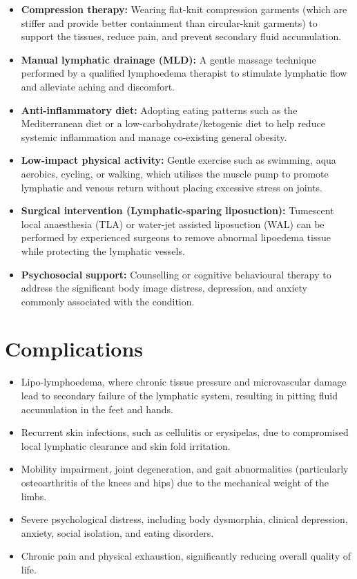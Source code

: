 \begin{itemize}
    \item \textbf{Compression therapy:} Wearing flat-knit compression garments (which are stiffer and provide better containment than circular-knit garments) to support the tissues, reduce pain, and prevent secondary fluid accumulation.
    \item \textbf{Manual lymphatic drainage (MLD):} A gentle massage technique performed by a qualified lymphoedema therapist to stimulate lymphatic flow and alleviate aching and discomfort.
    \item \textbf{Anti-inflammatory diet:} Adopting eating patterns such as the Mediterranean diet or a low-carbohydrate/ketogenic diet to help reduce systemic inflammation and manage co-existing general obesity.
    \item \textbf{Low-impact physical activity:} Gentle exercise such as swimming, aqua aerobics, cycling, or walking, which utilises the muscle pump to promote lymphatic and venous return without placing excessive stress on joints.
    \item \textbf{Surgical intervention (Lymphatic-sparing liposuction):} Tumescent local anaesthesia (TLA) or water-jet assisted liposuction (WAL) can be performed by experienced surgeons to remove abnormal lipoedema tissue while protecting the lymphatic vessels.
    \item \textbf{Psychosocial support:} Counselling or cognitive behavioural therapy to address the significant body image distress, depression, and anxiety commonly associated with the condition.
\end{itemize}

\section*{Complications}
\begin{itemize}
    \item Lipo-lymphoedema, where chronic tissue pressure and microvascular damage lead to secondary failure of the lymphatic system, resulting in pitting fluid accumulation in the feet and hands.
    \item Recurrent skin infections, such as cellulitis or erysipelas, due to compromised local lymphatic clearance and skin fold irritation.
    \item Mobility impairment, joint degeneration, and gait abnormalities (particularly osteoarthritis of the knees and hips) due to the mechanical weight of the limbs.
    \item Severe psychological distress, including body dysmorphia, clinical depression, anxiety, social isolation, and eating disorders.
    \item Chronic pain and physical exhaustion, significantly reducing overall quality of life.
\end{itemize}


